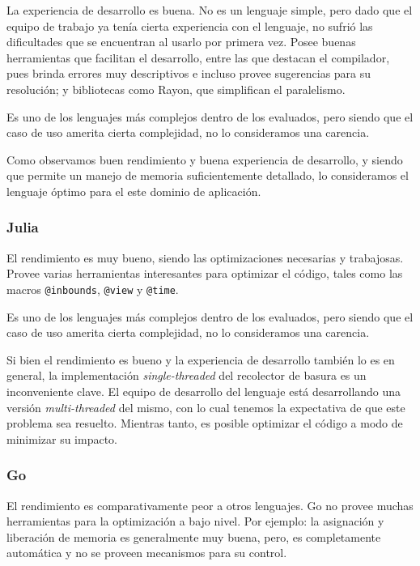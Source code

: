 \documentclass[11pt]{article}
\let\Oldsubsubsection\subsubsection
\renewcommand{\subsubsection}{\FloatBarrier\Oldsubsubsection}
\newcommand{\english}[1]{\textit{#1}}
\begin{document}
La experiencia de desarrollo es buena. No es un lenguaje simple, pero dado que el equipo de trabajo ya tenía cierta experiencia con el lenguaje, no sufrió las dificultades que se encuentran al usarlo por primera vez. Posee buenas herramientas que facilitan el desarrollo, entre las que destacan el compilador, pues brinda errores muy descriptivos e incluso provee sugerencias para su resolución; y bibliotecas como Rayon, que simplifican el paralelismo.

Es uno de los lenguajes más complejos dentro de los evaluados, pero siendo que el caso de uso amerita cierta complejidad, no lo consideramos una carencia.

Como observamos buen rendimiento y buena experiencia de desarrollo, y siendo que permite un manejo de memoria suficientemente detallado, lo consideramos el lenguaje óptimo para el este dominio de aplicación.

\subsubsection{Julia}

El rendimiento es muy bueno, siendo las optimizaciones necesarias y trabajosas. Provee varias herramientas interesantes para optimizar el código, tales como las macros \lstinline{@inbounds}, \lstinline{@view} y \lstinline{@time}.

Es uno de los lenguajes más complejos dentro de los evaluados, pero siendo que el caso de uso amerita cierta complejidad, no lo consideramos una carencia.

Si bien el rendimiento es bueno y la experiencia de desarrollo también lo es en general, la implementación \english{single-threaded} del recolector de basura es un inconveniente clave. El equipo de desarrollo del lenguaje está desarrollando una versión \english{multi-threaded} del mismo, con lo cual tenemos la expectativa de que este problema sea resuelto. Mientras tanto, es posible optimizar el código a modo de minimizar su impacto.

\subsubsection{Go}

El rendimiento es comparativamente peor a otros lenguajes. Go no provee muchas herramientas para la optimización a bajo nivel. Por ejemplo: la asignación y liberación de memoria es generalmente muy buena, pero, es completamente automática y no se proveen mecanismos para su control.
\end{document}
